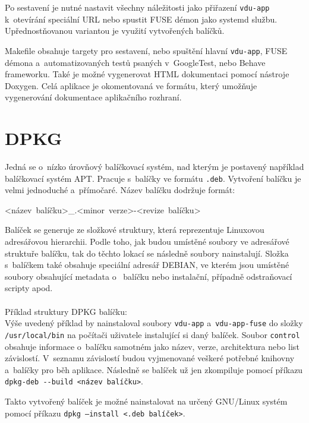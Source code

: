 Po sestavení je nutné nastavit všechny náležitosti jako přiřazení \texttt{vdu-app} k otevírání speciální URL nebo spustit FUSE démon jako systemd službu. Upřednostňovanou
variantou je využití vytvořených balíčků.

Makefile obsahuje targety pro sestavení, nebo spuštění hlavní \texttt{vdu-app}, FUSE démona a automatizovaných testů psaných v GoogleTest, nebo Behave frameworku. Také je
možné vygenerovat HTML dokumentaci pomocí nástroje Doxygen. Celá aplikace je okomentovaná ve formátu, který umožňuje vygenerování dokumentace aplikačního rozhraní.

\section{DPKG}

Jedná se o nízko úrovňový balíčkovací systém, nad kterým je postavený například balíčkovací systém APT. Pracuje s balíčky ve formátu \texttt{.deb}. Vytvoření balíčku
je velmi jednoduché a přímočaré. Název balíčku dodržuje formát: 
\begin{center}
    \mbox{<název balíčku>\_<major verze>.<minor verze>-<revize balíčku>}
\end{center}
Balíček se generuje ze složkové struktury, která reprezentuje Linuxovou adresářovou hierarchii. Podle toho, jak budou umístěné soubory ve adresářové struktuře balíčku,
tak do těchto lokací se následně soubory nainstalují. Složka s balíčkem také obsahuje speciální adresář DEBIAN, ve kterém jsou umístěné soubory obsahující metadata o 
balíčku nebo instalační, případně odstraňovací scripty apod. \cite{dpkg}
\\\\
\noindent Příklad struktury DPKG balíčku: 
\\
\bigskip
Výše uvedený příklad by nainstaloval soubory \texttt{vdu-app} a \texttt{vdu-app-fuse} do složky \texttt{/usr/local/bin} na počítači uživatele instalující si daný balíček.
Soubor \texttt{control} obsahuje informace o balíčku samotném jako název, verze, architektura nebo list závislostí. V seznamu závislostí budou vyjmenované veškeré potřebné
knihovny a balíčky pro běh aplikace. Následně se balíček už jen zkompiluje pomocí příkazu \texttt{\mbox{dpkg-deb -{}-build <název balíčku>}}.

Takto vytvořený balíček je možné nainstalovat na určený GNU/Linux systém pomocí příkazu \texttt{\mbox{dpkg --install <.deb balíček>}}. \cite{dpkg}

